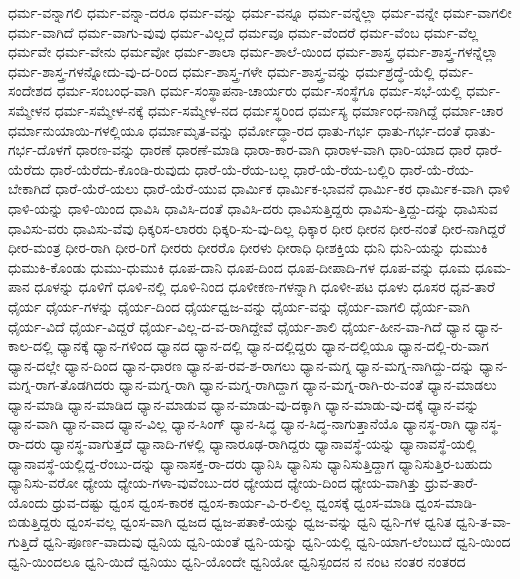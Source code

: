 {ಧರ್ಮ-ವನ್ನಾಗಲಿ
ಧರ್ಮ-ವನ್ನಾ-ದರೂ
ಧರ್ಮ-ವನ್ನು
ಧರ್ಮ-ವನ್ನೂ
ಧರ್ಮ-ವನ್ನೆಲ್ಲಾ
ಧರ್ಮ-ವನ್ನೇ
ಧರ್ಮ-ವಾಗಲೀ
ಧರ್ಮ-ವಾಗಿದೆ
ಧರ್ಮ-ವಾಗು-ವುವು
ಧರ್ಮ-ವಿಲ್ಲದೆ
ಧರ್ಮವೂ
ಧರ್ಮ-ವೆಂದರೆ
ಧರ್ಮ-ವೆಂಬ
ಧರ್ಮ-ವೆಲ್ಲ
ಧರ್ಮವೇ
ಧರ್ಮ-ವೇನು
ಧರ್ಮವೋ
ಧರ್ಮ-ಶಾಲಾ
ಧರ್ಮ-ಶಾಲೆ-ಯಿಂದ
ಧರ್ಮ-ಶಾಸ್ತ್ರ
ಧರ್ಮ-ಶಾಸ್ತ್ರ-ಗಳನ್ನೆಲ್ಲಾ
ಧರ್ಮ-ಶಾಸ್ತ್ರ-ಗಳನ್ನೋದು-ವು-ದ-ರಿಂದ
ಧರ್ಮ-ಶಾಸ್ತ್ರ-ಗಳೇ
ಧರ್ಮ-ಶಾಸ್ತ್ರ-ವನ್ನು
ಧರ್ಮಶ್ರದ್ಧೆ-ಯೆಲ್ಲಿ
ಧರ್ಮ-ಸಂದೇಶದ
ಧರ್ಮ-ಸಂಬಂಧ-ವಾಗಿ
ಧರ್ಮ-ಸಂಸ್ಥಾಪನಾ-ಚಾರ್ಯರು
ಧರ್ಮ-ಸಂಸ್ಥೆಗೂ
ಧರ್ಮ-ಸಭೆ-ಯಲ್ಲಿ
ಧರ್ಮ-ಸಮ್ಮೇಳನ
ಧರ್ಮ-ಸಮ್ಮೇಳ-ನಕ್ಕೆ
ಧರ್ಮ-ಸಮ್ಮೇಳ-ನದ
ಧರ್ಮಸ್ಥರಿಂದ
ಧರ್ಮಸ್ಯ
ಧರ್ಮಾಂಧ-ನಾಗಿದ್ದೆ
ಧರ್ಮಾ-ಚಾರ
ಧರ್ಮಾನುಯಾಯಿ-ಗಳಲ್ಲಿಯೂ
ಧರ್ಮಾಮೃತ-ವನ್ನು
ಧರ್ಮೋದ್ಧಾ-ರದ
ಧಾತು-ಗರ್ಭ
ಧಾತು-ಗರ್ಭ-ದಂತೆ
ಧಾತು-ಗರ್ಭ-ದೊಳಗೆ
ಧಾರಣ-ವನ್ನು
ಧಾರಣೆ
ಧಾರಣೆ-ಮಾಡಿ
ಧಾರಾ-ಕಾರ-ವಾಗಿ
ಧಾರಾಳ-ವಾಗಿ
ಧಾರಿ-ಯಾದ
ಧಾರೆ
ಧಾರೆ-ಯೆರೆದು
ಧಾರೆ-ಯೆರೆದು-ಕೊಂಡಿ-ರುವುದು
ಧಾರೆ-ಯೆ-ರೆಯ-ಬಲ್ಲ
ಧಾರೆ-ಯೆ-ರೆಯ-ಬಲ್ಲಿರಿ
ಧಾರೆ-ಯೆ-ರೆಯ-ಬೇಕಾಗಿದೆ
ಧಾರೆ-ಯೆರೆ-ಯಲು
ಧಾರೆ-ಯೆರೆ-ಯುವ
ಧಾರ್ಮಿಕ
ಧಾರ್ಮಿಕ-ಭಾವನೆ
ಧಾರ್ಮಿ-ಕರ
ಧಾರ್ಮಿಕ-ವಾಗಿ
ಧಾಳಿ
ಧಾಳಿ-ಯನ್ನು
ಧಾಳಿ-ಯಿಂದ
ಧಾವಿಸಿ
ಧಾವಿಸಿ-ದಂತೆ
ಧಾವಿಸಿ-ದರು
ಧಾವಿಸುತ್ತಿದ್ದರು
ಧಾವಿಸು-ತ್ತಿದ್ದು-ದನ್ನು
ಧಾವಿಸುವ
ಧಾವಿಸು-ವರು
ಧಾವಿಸು-ವೆವು
ಧಿಕ್ಕರಿಸ-ಲಾರರು
ಧಿಕ್ಕರಿ-ಸು-ವು-ದಿಲ್ಲ
ಧಿಕ್ಕಾರ
ಧೀರ
ಧೀರನ
ಧೀರ-ನಂತೆ
ಧೀರ-ನಾಗಿದ್ದರೆ
ಧೀರ-ಮಂತ್ರ
ಧೀರ-ರಾಗಿ
ಧೀರ-ರಿಗೆ
ಧೀರರು
ಧೀರರೊ
ಧೀರಳು
ಧೀರಾಧಿ
ಧೀಶಕ್ತಿಯ
ಧುನಿ
ಧುನಿ-ಯನ್ನು
ಧುಮುಕಿ
ಧುಮುಕಿ-ಕೊಂಡು
ಧುಮು-ಧುಮುಕಿ
ಧೂಪ-ದಾನಿ
ಧೂಪ-ದಿಂದ
ಧೂಪ-ದೀಪಾದಿ-ಗಳ
ಧೂಪ-ವನ್ನು
ಧೂಮ
ಧೂಮ-ಪಾನ
ಧೂಳನ್ನು
ಧೂಳಿಗೆ
ಧೂಳಿ-ನಲ್ಲಿ
ಧೂಳಿ-ನಿಂದ
ಧೂಳೀಕಣ-ಗಳನ್ನಾಗಿ
ಧೂಳೀ-ಪಟ
ಧೂಳು
ಧೂಸರ
ಧೃವ-ತಾರೆ
ಧೈರ್ಯ
ಧೈರ್ಯ-ಗಳನ್ನು
ಧೈರ್ಯ-ದಿಂದ
ಧೈರ್ಯಧ್ವಜ-ವನ್ನು
ಧೈರ್ಯ-ವನ್ನು
ಧೈರ್ಯ-ವಾಗಲಿ
ಧೈರ್ಯ-ವಾಗಿ
ಧೈರ್ಯ-ವಿದೆ
ಧೈರ್ಯ-ವಿದ್ದರೆ
ಧೈರ್ಯ-ವಿಲ್ಲ-ದ-ವ-ರಾಗಿದ್ದೇವೆ
ಧೈರ್ಯ-ಶಾಲಿ
ಧೈರ್ಯ-ಹೀನ-ವಾ-ಗಿದೆ
ಧ್ಯಾನ
ಧ್ಯಾನ-ಕಾಲ-ದಲ್ಲಿ
ಧ್ಯಾನಕ್ಕೆ
ಧ್ಯಾನ-ಗಳಿಂದ
ಧ್ಯಾನದ
ಧ್ಯಾನ-ದಲ್ಲಿ
ಧ್ಯಾನ-ದಲ್ಲಿದ್ದರು
ಧ್ಯಾನ-ದಲ್ಲಿಯೂ
ಧ್ಯಾನ-ದಲ್ಲಿ-ರು-ವಾಗ
ಧ್ಯಾನ-ದಲ್ಲೇ
ಧ್ಯಾನ-ದಿಂದ
ಧ್ಯಾನ-ಧಾರಣ
ಧ್ಯಾನ-ಪ-ರವ-ಶ-ರಾಗಲು
ಧ್ಯಾನ-ಮಗ್ನ
ಧ್ಯಾನ-ಮಗ್ನ-ನಾಗಿದ್ದು-ದನ್ನು
ಧ್ಯಾನ-ಮಗ್ನ-ರಾಗ-ತೊಡಗಿದರು
ಧ್ಯಾನ-ಮಗ್ನ-ರಾಗಿ
ಧ್ಯಾನ-ಮಗ್ನ-ರಾಗಿದ್ದಾಗ
ಧ್ಯಾನ-ಮಗ್ನ-ರಾಗಿ-ರು-ವಂತೆ
ಧ್ಯಾನ-ಮಾಡಲು
ಧ್ಯಾನ-ಮಾಡಿ
ಧ್ಯಾನ-ಮಾಡಿದ
ಧ್ಯಾನ-ಮಾಡುವ
ಧ್ಯಾನ-ಮಾಡು-ವು-ದಕ್ಕಾಗಿ
ಧ್ಯಾನ-ಮಾಡು-ವು-ದಕ್ಕೆ
ಧ್ಯಾನ-ವನ್ನು
ಧ್ಯಾನ-ವಾಗಿ
ಧ್ಯಾನ-ವಾದ
ಧ್ಯಾನ-ವಿಲ್ಲ
ಧ್ಯಾನ-ಸಿಂಗ್
ಧ್ಯಾನ-ಸಿದ್ಧ
ಧ್ಯಾನ-ಸಿದ್ಧ-ನಾಗುತ್ತಾನೆಯೊ
ಧ್ಯಾನಸ್ಥ-ರಾಗಿ
ಧ್ಯಾನಸ್ಥ-ರಾ-ದರು
ಧ್ಯಾನಸ್ಥ-ವಾಗುತ್ತದೆ
ಧ್ಯಾನಾದಿ-ಗಳಲ್ಲಿ
ಧ್ಯಾನಾರೂಢ-ರಾಗಿದ್ದರು
ಧ್ಯಾನಾವಸ್ಥೆ-ಯನ್ನು
ಧ್ಯಾನಾವಸ್ಥೆ-ಯಲ್ಲಿ
ಧ್ಯಾನಾವಸ್ಥೆ-ಯಲ್ಲಿದ್ದ-ರೆಂಬು-ದನ್ನು
ಧ್ಯಾನಾಸಕ್ತ-ರಾ-ದರು
ಧ್ಯಾನಿಸಿ
ಧ್ಯಾನಿಸು
ಧ್ಯಾನಿಸುತ್ತಿದ್ದಾಗ
ಧ್ಯಾನಿಸುತ್ತಿರ-ಬಹುದು
ಧ್ಯಾನಿಸು-ವರೋ
ಧ್ಯೇಯ
ಧ್ಯೇಯ-ಗಳಾ-ವುವೆಂಬು-ದರ
ಧ್ಯೇಯದ
ಧ್ಯೇಯ-ದಿಂದ
ಧ್ಯೇಯ-ವಾಗಿತ್ತು
ಧ್ರುವ-ತಾರೆ-ಯೊಂದು
ಧ್ರುವ-ದಷ್ಟು
ಧ್ವಂಸ
ಧ್ವಂಸ-ಕಾರಕ
ಧ್ವಂಸ-ಕಾರ್ಯ-ವಿ-ರ-ಲಿಲ್ಲ
ಧ್ವಂಸಕ್ಕೆ
ಧ್ವಂಸ-ಮಾಡಿ
ಧ್ವಂಸ-ಮಾಡಿ-ಬಿಡುತ್ತಿದ್ದರು
ಧ್ವಂಸ-ವಲ್ಲ
ಧ್ವಂಸ-ವಾಗಿ
ಧ್ವಜದ
ಧ್ವಜ-ಪತಾಕೆ-ಯನ್ನು
ಧ್ವಜ-ವನ್ನು
ಧ್ವನಿ
ಧ್ವನಿ-ಗಳ
ಧ್ವನಿತ
ಧ್ವನಿ-ತ-ವಾ-ಗುತ್ತಿದೆ
ಧ್ವನಿ-ಪೂರ್ಣ-ವಾದುವು
ಧ್ವನಿಯ
ಧ್ವನಿ-ಯಂತೆ
ಧ್ವನಿ-ಯನ್ನು
ಧ್ವನಿ-ಯಲ್ಲಿ
ಧ್ವನಿ-ಯಾಗ-ಲೆಂಬುದೆ
ಧ್ವನಿ-ಯಿಂದ
ಧ್ವನಿ-ಯಿಂದಲೂ
ಧ್ವನಿ-ಯಿದೆ
ಧ್ವನಿಯು
ಧ್ವನಿ-ಯೊಂದೇ
ಧ್ವನಿಯೋ
ಧ್ವನಿಸ್ಪಂದನ
ನ
ನಂಟ
ನಂತರ
ನಂತರದ
}
